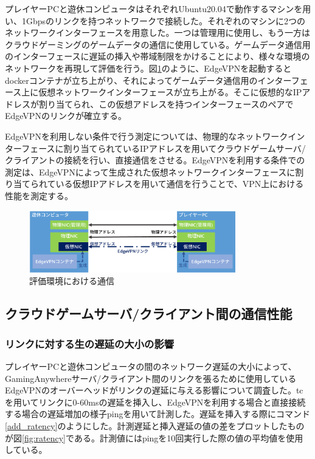 プレイヤーPCと遊休コンピュータはそれぞれUbuntu20.04で動作するマシンを用い、1Gbpsのリンクを持つネットワークで接続した。それぞれのマシンに2つのネットワークインターフェースを用意した。一つは管理用に使用し、もう一方はクラウドゲーミングのゲームデータの通信に使用している。ゲームデータ通信用のインターフェースに遅延の挿入や帯域制限をかけることにより、様々な環境のネットワークを再現して評価を行う。図\ref{fig:nic}のように、EdgeVPNを起動するとdockerコンテナが立ち上がり、それによってゲームデータ通信用のインターフェース上に仮想ネットワークインターフェースが立ち上がる。そこに仮想的なIPアドレスが割り当てられ、この仮想アドレスを持つインターフェースのペアでEdgeVPNのリンクが確立する。

EdgeVPNを利用しない条件で行う測定については、物理的なネットワークインターフェースに割り当てられているIPアドレスを用いてクラウドゲームサーバ/クライアントの接続を行い、直接通信をさせる。EdgeVPNを利用する条件での測定は、EdgeVPNによって生成された仮想ネットワークインターフェースに割り当てられている仮想IPアドレスを用いて通信を行うことで、VPN上における性能を測定する。

\begin{figure}[t]
    \centering
    \includegraphics[width=0.8\textwidth,keepaspectratio,clip]{img/nic.eps}
    \caption{評価環境における通信}
    \label{fig:nic}
\end{figure}

\subsection{クラウドゲームサーバ/クライアント間の通信性能}

\subsubsection{リンクに対する生の遅延の大小の影響}
プレイヤーPCと遊休コンピュータの間のネットワーク遅延の大小によって、GamingAnywhereサーバ/クライアント間のリンクを張るために使用しているEdgeVPNのオーバーヘッドがリンクの遅延に与える影響について調査した。tc\cite{iproute2}を用いてリンクに0-60msの遅延を挿入し、EdgeVPNを利用する場合と直接接続する場合の遅延増加の様子ping\cite{ping}を用いて計測した。遅延を挿入する際にコマンド\ref{add_ratency}のようにした。計測遅延と挿入遅延の値の差をプロットしたものが図\ref{fig:ratency}である。計測値にはpingを10回実行した際の値の平均値を使用している。

